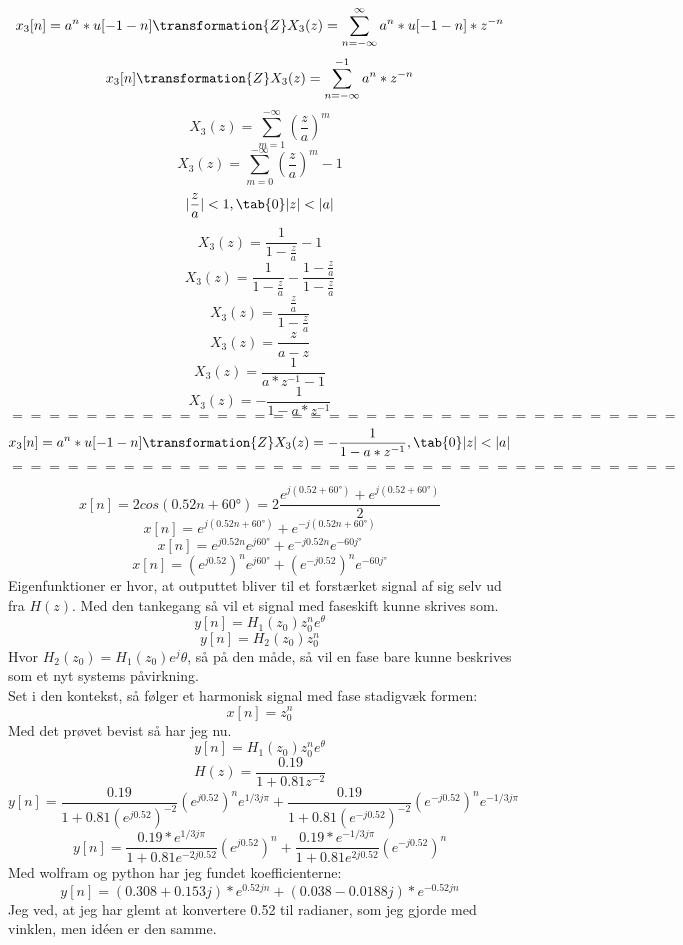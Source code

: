 \begin{Udledninger}
\begin{underrubrik}
    \end{underrubrik}
    \begin{underrubrik}
        \[x_3[n] = a^n*u[-1-n] \transformation{Z} X_3(z) = \sum_{n=-\infty}^{\infty}     {a^n*u[-1-n]*z^{-n}}\]
        \[x_3[n] \transformation{Z} X_3(z) = \sum_{n=-\infty}^{-1}                               {a^n*z^{-n}}\]
        \[X_3(z) = \sum_{m = 1}^{-\infty}                                                   {(\frac{z}{a})^m}\]
        \[X_3(z) = \sum_{m = 0}^{-\infty}                                               {(\frac{z}{a})^m} - 1\]
        \[|\frac{z}{a}|<1, \tab{0} |z|<|a|\]
        \[X_3(z) = \frac{1}{1 - \frac{z}{a}} - 1\]
        \[X_3(z) = \frac{1}{1 - \frac{z}{a}} - \frac{1 - \frac{z}{a}}{1 - \frac{z}{a}}\]
        \[X_3(z) = \frac{\frac{z}{a}}{1 - \frac{z}{a}}\]
        \[X_3(z) = \frac{z}{a - z}\]
        \[X_3(z) = \frac{1}{a*z^{-1} - 1}\]
        \[X_3(z) = - \frac{1}{1 - a*z^{-1}}\]
        \[====================================\]
        \[x_3[n] = a^n*u[-1-n] \transformation{Z} X_3(z) = - \frac{1}{1 - a*z^{-1}}, \tab{0} |z|<|a|\]
        \[====================================\]
    \end{underrubrik}
    \begin{underrubrik} 
        \[x[n] = 2cos(0.52n + 60°) = 2 \frac{e^{j(0.52 + 60°)} + e^{j(0.52 + 60°)}}{2}\]
        \[x[n] = e^{j(0.52n + 60°)} + e^{-j(0.52n + 60°)}\]
        \[x[n] = e^{j0.52n}e^{j60°} + e^{-j0.52n}e^{-60j°}\]
        \[x[n] = (e^{j0.52})^ne^{j60°} + (e^{-j0.52})^ne^{-60j°}\]
        Eigenfunktioner er hvor, at outputtet bliver til et forstærket signal af sig selv ud fra $H(z)$. Med den tankegang så vil et signal med faseskift kunne skrives som. 
        \[y[n] = H_1(z_0)z_0^ne^\theta\] 
        \[y[n] = H_2(z_0)z_0^n\]
        Hvor $H_2(z_0) = H_1(z_0)e^j\theta$, så på den måde, så vil en fase bare kunne beskrives som et nyt systems påvirkning.\\
        Set i den kontekst, så følger et harmonisk signal med fase stadigvæk formen: 
        \[x[n] = z_0^n\]
        Med det prøvet bevist så har jeg nu. 
        \[y[n] = H_1(z_0)z_0^ne^\theta\] 
        \[H(z) = \frac{0.19}{1 + 0.81z^{-2}}\]
        \[y[n] = \frac{0.19}{1 + 0.81(e^{j0.52})^{-2}}(e^{j0.52})^ne^{1/3j\pi} + \frac{0.19}{1 + 0.81(e^{-j0.52})^{-2}}(e^{-j0.52})^ne^{-1/3j\pi}\] 
        \[y[n] = \frac{0.19*e^{1/3j\pi}}{1 + 0.81e^{-2j0.52}}(e^{j0.52})^n + \frac{0.19*e^{-1/3j\pi}}{1 + 0.81e^{2j0.52}}(e^{-j0.52})^n\] 
        Med wolfram og python har jeg fundet koefficienterne: 
        \[y[n] = (0.308 + 0.153j) * e^{0.52jn} + (0.038 - 0.0188j) * e^{-0.52jn}\]
        \color{red} Jeg ved, at jeg har glemt at konvertere 0.52 til radianer, som jeg gjorde med vinklen, men idéen er den samme.
        
    \end{underrubrik}

\end{Udledninger}